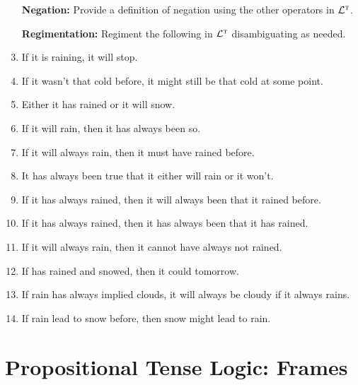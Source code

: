 \documentclass[a4paper, 11pt]{article} %
\begin{document}
\begin{enumerate}[leftmargin=1.2in,itemsep=2pt]\small
  \item[\bf Negation:] Provide a definition of negation using the other operators in $\mathcal{L}^{\textsc{t}}$.
	\item[\bf Regimentation:] Regiment the following in $\mathcal{L}^{\textsc{t}}$ disambiguating as needed.
  \item If it is raining, it will stop.
  \item If it wasn't that cold before, it might still be that cold at some point.
	\item Either it has rained or it will snow.
  \item If it will rain, then it has always been so.
	\item If it will always rain, then it must have rained before.
	\item It has always been true that it either will rain or it won't.
	\item If it has always rained, then it will always been that it rained before.
	\item If it has always rained, then it has always been that it has rained.
	\item If it will always rain, then it cannot have always not rained.
	\item If has rained and snowed, then it could tomorrow.
	\item If rain has always implied clouds, it will always be cloudy if it always rains.
	\item If rain lead to snow before, then snow might lead to rain.
\end{enumerate}




\section*{\sc Propositional Tense Logic: Frames}
\end{document}
